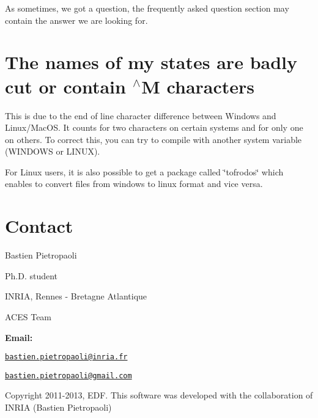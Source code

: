 As sometimes, we got a question, the frequently asked question section may contain the answer we are looking for.\hypertarget{_f_a_q_page_FAQ_character}{}\section{The names of my states are badly cut or contain $^\wedge$\-M characters}\label{_f_a_q_page_FAQ_character}
This is due to the end of line character difference between Windows and Linux/\-Mac\-O\-S. It counts for two characters on certain systems and for only one on others. To correct this, you can try to compile with another system variable (W\-I\-N\-D\-O\-W\-S or L\-I\-N\-U\-X).

For Linux users, it is also possible to get a package called \char`\"{}tofrodos\char`\"{} which enables to convert files from windows to linux format and vice versa.\hypertarget{_f_a_q_page_FAQ_contact}{}\section{Contact}\label{_f_a_q_page_FAQ_contact}
Bastien Pietropaoli \par
 Ph.\-D. student \par
 I\-N\-R\-I\-A, Rennes -\/ Bretagne Atlantique \par
 A\-C\-E\-S Team \par


{\bfseries Email\-:} \par
 \href{mailto:bastien.pietropaoli@inria.fr}{\tt bastien.\-pietropaoli@inria.\-fr} \par
 \href{mailto:bastien.pietropaoli@gmail.com}{\tt bastien.\-pietropaoli@gmail.\-com} \par


Copyright 2011-\/2013, E\-D\-F. This software was developed with the collaboration of I\-N\-R\-I\-A (Bastien Pietropaoli) 